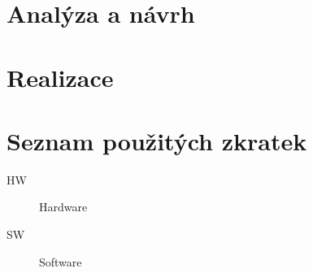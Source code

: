 \documentclass[thesis=B,czech]{FITthesis}[2012/06/26]
\begin{document}
	
\chapter{Analýza a návrh}

\chapter{Realizace}

\begin{conclusion}
\end{conclusion}




\appendix

\chapter{Seznam použitých zkratek}
\begin{description}
	\item[HW] Hardware
	\item[SW] Software
\end{description}
\end{document}
